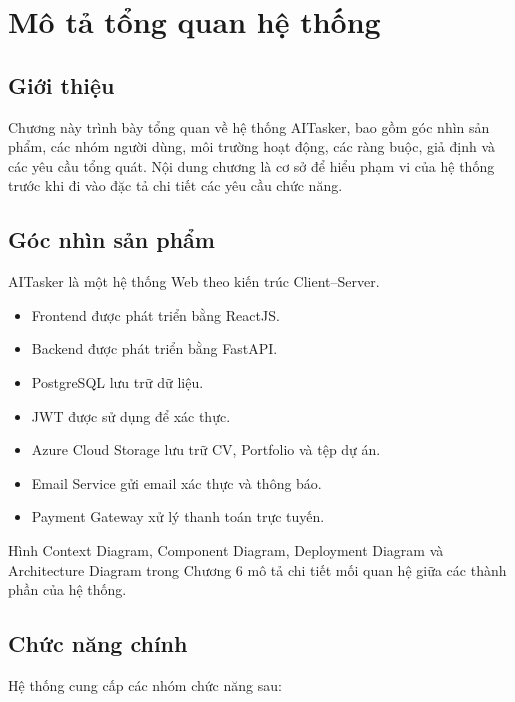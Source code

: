 

\chapter{Mô tả tổng quan hệ thống}
\label{chap:overall}

\section{Giới thiệu}

Chương này trình bày tổng quan về hệ thống AITasker, bao gồm góc nhìn sản phẩm, các nhóm người dùng, môi trường hoạt động, các ràng buộc, giả định và các yêu cầu tổng quát. Nội dung chương là cơ sở để hiểu phạm vi của hệ thống trước khi đi vào đặc tả chi tiết các yêu cầu chức năng.

\section{Góc nhìn sản phẩm}

AITasker là một hệ thống Web theo kiến trúc Client--Server.

\begin{itemize}
\item Frontend được phát triển bằng ReactJS.
\item Backend được phát triển bằng FastAPI.
\item PostgreSQL lưu trữ dữ liệu.
\item JWT được sử dụng để xác thực.
\item Azure Cloud Storage lưu trữ CV, Portfolio và tệp dự án.
\item Email Service gửi email xác thực và thông báo.
\item Payment Gateway xử lý thanh toán trực tuyến.
\end{itemize}

Hình Context Diagram, Component Diagram, Deployment Diagram và Architecture Diagram trong Chương 6 mô tả chi tiết mối quan hệ giữa các thành phần của hệ thống.

\section{Chức năng chính}

Hệ thống cung cấp các nhóm chức năng sau:

